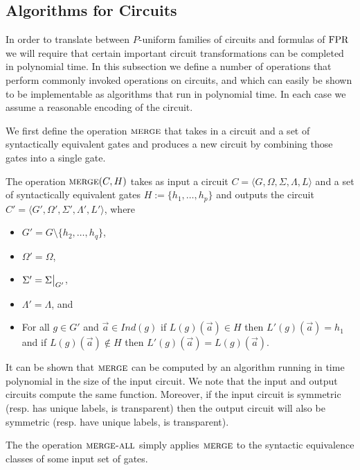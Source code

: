 \documentclass[../paper.tex]{subfiles}
\begin{document}
\subsection{Algorithms for Circuits}
In order to translate between $P$-uniform families of circuits and formulas of
$\text{\upshape FPR}$ we will require that certain important circuit transformations can be
completed in polynomial time. In this subsection we define a number of
operations that perform commonly invoked operations on circuits, and which can
easily be shown to be implementable as algorithms that run in polynomial time.
In each case we assume a reasonable encoding of the circuit.

We first define the operation ${\normalfont\textsc{merge}}$ that takes in a circuit and a set of
syntactically equivalent gates and produces a new circuit by combining those
gates into a single gate.

\begin{definition}
  The operation ${\normalfont\textsc{merge}}(C, H)$ takes as input a circuit $C = \langle G,
  \Omega, \Sigma , \Lambda, L \rangle$ and a set of syntactically equivalent
  gates $H := \{h_1, \ldots , h_p\}$ and outputs the circuit $C' = \langle G',
  \Omega', \Sigma', \Lambda', L' \rangle$, where
  \begin{itemize}
    \setlength\itemsep{0mm}
  \item $G' = G \setminus \{h_2, \ldots, h_q\}$,
  \item $\Omega' = \Omega$,
  \item $\Sigma' = \restr{\Sigma}{G'}$,
  \item $\Lambda' = \Lambda$, and
  \item For all $g \in G'$ and $\vec{a} \in Ind(g)$ if $L(g) (\vec{a}) \in H$
    then $L'(g)(\vec{a}) = h_1$ and if $L(g)(\vec{a}) \notin H$ then
    $L'(g)(\vec{a}) = L(g)(\vec{a})$.
  \end{itemize}
\end{definition}

It can be shown that ${\normalfont\textsc{merge}}$ can be computed by an algorithm running in
time polynomial in the size of the input circuit. We note that the input and
output circuits compute the same function. Moreover, if the input circuit is
symmetric (resp. has unique labels, is transparent) then the output circuit will
also be symmetric (resp. have unique labels, is transparent).

The the operation ${\normalfont\textsc{merge-all}}$ simply applies ${\normalfont\textsc{merge}}$ to the syntactic
equivalence classes of some input set of gates.
\end{document}

